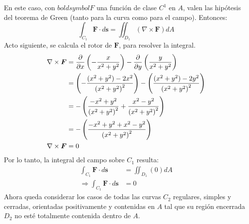 \begin{solution}
\begin{center}
\begin{tikzpicture}
        \end{tikzpicture}
    \end{center}
    En este caso, con $boldsymbol{F}$ una función de clase
    $C^1$ en $A$, valen las hipótesis del teorema de Green (tanto para la curva como para el campo). Entonces:
    \begin{equation*}
        \int_{C_1}\boldsymbol{F}\cdot d\boldsymbol{s} = \iint_{D_1}\left(\nabla \times \boldsymbol{F}\right)dA
    \end{equation*}
    Acto siguiente, se calcula el rotor de $\boldsymbol{F}$, para resolver la integral.
    \begin{align*}
        \nabla \times \boldsymbol{F} &= \partialx\left( -\frac{x}{x^2+y^2}\right) - \partialy\left(\frac{y}{x^2+y^2}\right)\\
        &= \left(-\frac{(x^2+y^2)-2x^2}{\left(x^2+y^2\right)^2}\right) - \left(\frac{(x^2+y^2)-2y^2}{\left(x^2+y^2\right)^2}\right)\\
        &= -\left(\frac{-x^2+y^2}{\left(x^2+y^2\right)^2}+\frac{x^2-y^2}{\left(x^2+y^2\right)^2}\right)\\
        &= -\left(\frac{-x^2+y^2+x^2-y^2}{\left(x^2+y^2\right)^2}\right)\\
        \nabla \times \boldsymbol{F}&= 0
    \end{align*}
    Por lo tanto, la integral del campo sobre $C_1$ resulta:
    \begin{align*}
        \int_{C_1}\boldsymbol{F}\cdot d\boldsymbol{s} &= \iint_{D_1}\left(0\right)dA\\
        \Rightarrow \int_{C_1}\boldsymbol{F}\cdot d\boldsymbol{s} &= 0
    \end{align*}
    Ahora queda considerar los casos de todas las curvas $C_2$ regulares, simples y cerradas, orientadas positivamente
    y contenidas en $A$ tal que su región encerrada $D_2$ no esté totalmente contenida dentro de $A$.
    \begin{center}
\end{center}
\end{solution}
